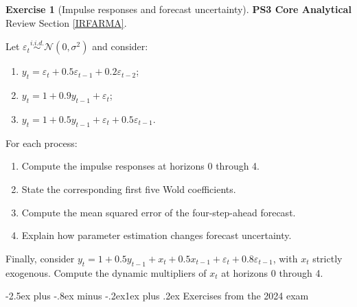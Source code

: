 \documentclass[
  11pt,
]{book}
\makeatletter
\providecommand{\tightlist}{%
  \setlength{\itemsep}{0pt}\setlength{\parskip}{0pt}}
\renewcommand\subsection{\@startsection{subsection}{2}{\z@}
  {-2.5ex plus -.8ex minus -.2ex}{1ex plus .2ex}
  {\normalfont\large\bfseries\color{TextbookInk}}}
\theoremstyle{definition}
\theoremstyle{definition}
\theoremstyle{definition}
\newtheorem{exercise}{Exercise}[chapter]
\theoremstyle{definition}
\theoremstyle{remark}
\makeatother
\begin{document}
\begin{exercisebox}

\begin{exercise}[Impulse responses and forecast uncertainty]
\protect\hypertarget{exr:ex-irf-forecasts}{}\label{exr:ex-irf-forecasts}\textbf{PS3 \textbar{} Core \textbar{} Analytical}\\
Review Section \ref{IRFARMA}.

Let \(\varepsilon_t\overset{i.i.d.}{\sim}\mathcal N(0,\sigma^2)\) and consider:

\begin{enumerate}
\def\labelenumi{\arabic{enumi}.}
\tightlist
\item
  \(y_t=\varepsilon_t+0.5\varepsilon_{t-1}+0.2\varepsilon_{t-2}\);
\item
  \(y_t=1+0.9y_{t-1}+\varepsilon_t\);
\item
  \(y_t=1+0.5y_{t-1}+\varepsilon_t+0.5\varepsilon_{t-1}\).
\end{enumerate}

For each process:

\begin{enumerate}
\def\labelenumi{\arabic{enumi}.}
\tightlist
\item
  Compute the impulse responses at horizons 0 through 4.
\item
  State the corresponding first five Wold coefficients.
\item
  Compute the mean squared error of the four-step-ahead forecast.
\item
  Explain how parameter estimation changes forecast uncertainty.
\end{enumerate}

Finally, consider \(y_t=1+0.5y_{t-1}+x_t+0.5x_{t-1}+\varepsilon_t+0.8\varepsilon_{t-1}\), with \(x_t\) strictly exogenous. Compute the dynamic multipliers of \(x_t\) at horizons 0 through 4.
\end{exercise}

\end{exercisebox}

\subsection{Exercises from the 2024 exam}\label{exercises-from-the-2024-exam}

\end{document}
